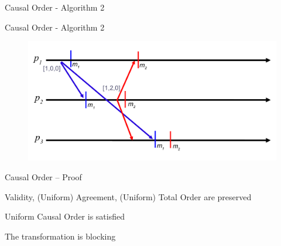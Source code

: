 \begin{frame}[shrink]{Causal Order - Algorithm 2}

\begin{Procedure}
\caption{Causal Order Transformation executed by process $p$}

\BlankLine
{}
\end{Procedure}

\end{frame}

\begin{frame}{Causal Order - Algorithm 2}
	
\begin{figure}
	\includegraphics[width=\textwidth]{figs/04/rb-causal-vc}
\end{figure}

\end{frame}

\begin{frame}{Causal Order -- Proof}

\BIL
\item \alert{Validity}, \alert{(Uniform) Agreement}, \alert{(Uniform) Total Order} are preserved
\item \alert{Uniform Causal Order} is satisfied
\item The transformation is blocking
\EIL

\end{frame}



